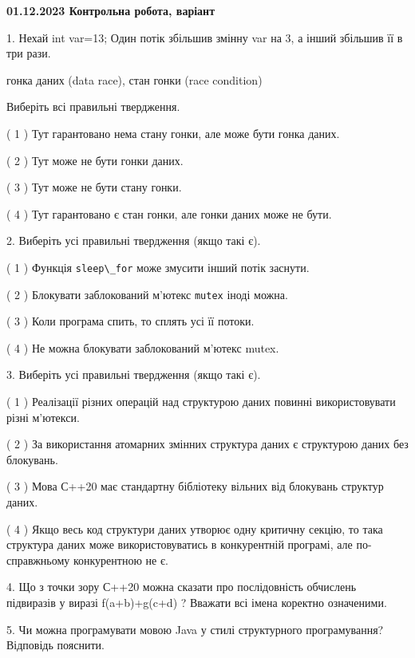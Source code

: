 \documentclass[12pt, ukrainian]{article}
\def\code#1{\Verb!#1!}
\begin{document}
\vspace{4mm}
\newpage
\begin {large}

\textbf{01.12.2023 Контрольна робота, варіант  }\par


{
1. Нехай int var=13; Один потік збільшив змінну var на 3, а інший збільшив її в три рази.

гонка даних (data race), стан гонки (race condition)

Виберіть всі правильні твердження.\par
\vspace{2mm}
( 1 ) Тут гарантовано нема стану гонки, але може бути гонка даних.%

( 2 ) Тут може не бути гонки даних.%

( 3 ) Тут може не бути стану гонки.%

( 4 ) Тут гарантовано є стан гонки, але гонки даних може не бути.%


\vspace{5mm}
2. Виберіть усі правильні твердження (якщо такі є).\par
\vspace{2mm}

( 1 ) Функція \code{sleep\_for} може змусити інший потік заснути.%

( 2 ) Блокувати заблокований м’ютекс  \code{mutex} іноді можна.%

( 3 ) Коли програма спить, то сплять усі її потоки.%

( 4 ) Не можна блокувати заблокований м’ютекс mutex.%


\vspace{5mm}
3. Виберіть усі правильні твердження (якщо такі є).\par
\vspace{2mm}

( 1 ) Реалізації різних операцій над структурою даних повинні використовувати різні м’ютекси.%

( 2 ) За використання атомарних змінних структура даних є структурою даних без блокувань.%

( 3 ) Мова С++20 має стандартну бібліотеку вільних від блокувань структур даних.%

( 4 ) Якщо весь код структури даних утворює одну критичну секцію, то така структура даних може використовуватись в конкурентній програмі, але по-справжньому конкурентною не є.%


\vspace{5mm}
4. Що з точки зору С++20 можна сказати про послідовність обчислень підвиразів у виразі f(a+b)+g(c+d) ? Вважати всі імена коректно означеними.



\vspace{5mm}
5. Чи можна програмувати мовою Java у стилі структурного програмування? Відповідь пояснити.
}
\end {large}
\end{document}
